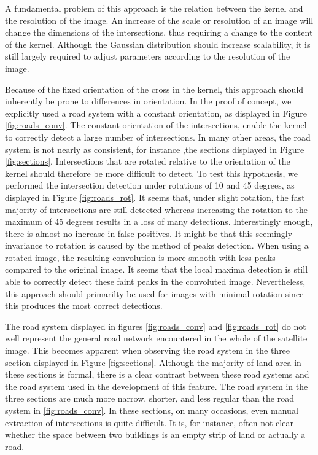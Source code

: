 A fundamental problem of this approach is the relation between the kernel and the resolution of the image. An increase of the scale or resolution of an image will change the dimensions of the intersections, thus requiring a change to the content of the kernel. Although the Gaussian distribution should increase scalability, it is still largely required to adjust parameters according to the resolution of the image.\newline

\noindent
Because of the fixed orientation of the cross in the kernel, this approach should inherently be prone to differences in orientation. In the proof of concept, we explicitly used a road system with a constant orientation, as displayed in Figure \ref{fig:roads_conv}. The constant orientation of the intersections, enable the kernel to correctly detect a large number of intersections. In many other areas, the road system is not nearly as consistent, for instance ,the sections displayed in Figure \ref{fig:sections}. Intersections that are rotated relative to the orientation of the kernel should therefore be more difficult to detect. To test this hypothesis, we performed the intersection detection under rotations of 10 and 45 degrees, as displayed in Figure \ref{fig:roads_rot}. It seems that, under slight rotation, the fast majority of intersections are still detected whereas increasing the rotation to the maximum of 45 degrees results in a loss of many detections. Interestingly enough, there is almost no increase in false positives. It might be that this seemingly invariance to rotation is caused by the method of peaks detection.  When using a rotated image, the resulting convolution is more smooth with less peaks compared to the original image. It seems that the local maxima detection is still able to correctly detect these faint peaks in the convoluted image. Nevertheless, this approach should primarilty be used for images with minimal rotation since this produces the most correct detections.\newline

\noindent
The road system displayed in figures \ref{fig:roads_conv} and \ref{fig:roads_rot} do not well represent the general road network encountered in the whole of the satellite image. This becomes apparent when observing the road system in the three section displayed in Figure \ref{fig:sections}. Although the majority of land area in these sections is formal, there is a clear contrast between these road systems and the road system used in the development of this feature. The road system in the three sections are much more narrow, shorter, and less regular than the road system in \ref{fig:roads_conv}. In these sections, on many occasions, even manual extraction of intersections is quite difficult. It is, for instance, often not clear whether the space between two buildings is an empty strip of land or actually a road. 

